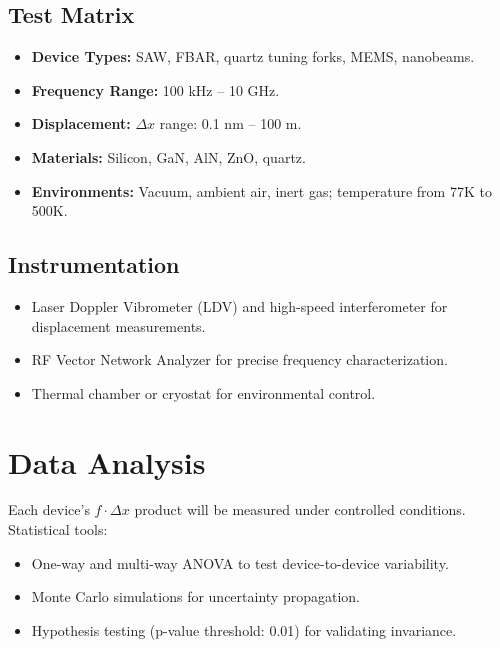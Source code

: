 \documentclass[11pt]{article}
\begin{document}
        \subsection*{Test Matrix}
        \begin{itemize}
            \item \textbf{Device Types:} SAW, FBAR, quartz tuning forks, MEMS, nanobeams.
            \item \textbf{Frequency Range:} 100 kHz -- 10 GHz.
            \item \textbf{Displacement:} \( \Delta x \) range: 0.1 nm -- 100 \textmu m.
            \item \textbf{Materials:} Silicon, GaN, AlN, ZnO, quartz.
            \item \textbf{Environments:} Vacuum, ambient air, inert gas; temperature from 77K to 500K.
        \end{itemize}

        \subsection*{Instrumentation}
        \begin{itemize}
            \item Laser Doppler Vibrometer (LDV) and high-speed interferometer for displacement measurements.
            \item RF Vector Network Analyzer for precise frequency characterization.
            \item Thermal chamber or cryostat for environmental control.
        \end{itemize}

        \section*{Data Analysis}
        Each device's \( f \cdot \Delta x \) product will be measured under controlled conditions. Statistical tools:
        \begin{itemize}
            \item One-way and multi-way ANOVA to test device-to-device variability.
            \item Monte Carlo simulations for uncertainty propagation.
            \item Hypothesis testing (p-value threshold: 0.01) for validating invariance.
        \end{itemize}
\end{document}
